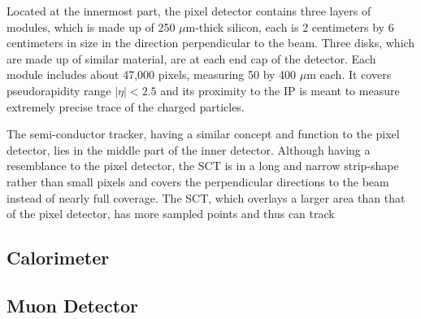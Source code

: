 \documentclass[class=NCU_thesis, crop=false]{standalone}
\begin{document}
		Located at the innermost part, the pixel detector contains three layers of modules, which is made up of 250 $\mu$m-thick silicon, each is 2 centimeters by 6 centimeters in size in the direction perpendicular to the beam. Three disks, which are made up of similar material, are at each end cap of the detector. Each module includes about 47,000 pixels, measuring 50 by 400 $\mu$m each. It covers pseudorapidity range $\lvert \eta \rvert < 2.5$ and its proximity to the IP is meant to measure extremely precise trace of the charged particles.
		
		The semi-conductor tracker, having a similar concept and function to the pixel detector, lies in the middle part of the inner detector. Although having a resemblance to the pixel detector, the SCT is in a long and narrow strip-shape rather than small pixels and covers the perpendicular directions to the beam instead of nearly full coverage. The SCT, which overlays a larger area than that of the pixel detector, has more sampled points and thus can track 
	
	\subsection{Calorimeter}
	
	\subsection{Muon Detector}
\end{document}
